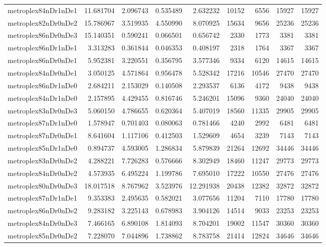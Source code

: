 \begin{longtable}{|l|r|r|r|r|r|r|r|r|}
metroplex84nDr1nDe1 & 11.681704 & 2.096743 & 0.535489 & 2.632232 & 10152 & 6556 & 15927 & 15927 \\
metroplex82nDr0nDe2 & 15.786967 & 3.519935 & 4.550990 & 8.070925 & 15634 & 9656 & 25236 & 25236 \\
metroplex86nDr0nDe3 & 15.140351 & 0.590241 & 0.066501 & 0.656742 & 2330 & 1773 & 3381 & 3381 \\
metroplex86nDr1nDe1 & 3.313283 & 0.361844 & 0.046353 & 0.408197 & 2318 & 1764 & 3367 & 3367 \\
metroplex86nDr0nDe1 & 5.952381 & 3.220551 & 0.356795 & 3.577346 & 9334 & 6120 & 14615 & 14615 \\
metroplex84nDr0nDe1 & 3.050125 & 4.571864 & 0.956478 & 5.528342 & 17216 & 10546 & 27470 & 27470 \\
metroplex86nDr1nDe0 & 2.684211 & 2.153029 & 0.140508 & 2.293537 & 6136 & 4172 & 9438 & 9438 \\
metroplex84nDr1nDe0 & 2.157895 & 4.429455 & 0.816746 & 5.246201 & 15096 & 9360 & 24040 & 24040 \\
metroplex83nDr0nDe3 & 5.060150 & 4.786655 & 0.620364 & 5.407019 & 18560 & 11335 & 29905 & 29905 \\
metroplex87nDr1nDe0 & 1.578947 & 0.701403 & 0.080063 & 0.781466 & 4240 & 2992 & 6481 & 6481 \\
metroplex87nDr0nDe1 & 8.641604 & 1.117106 & 0.412503 & 1.529609 & 4654 & 3239 & 7143 & 7143 \\
metroplex85nDr1nDe0 & 0.894737 & 4.593005 & 1.286834 & 5.879839 & 21264 & 12692 & 34446 & 34446 \\
metroplex83nDr0nDe2 & 4.288221 & 7.726283 & 0.576666 & 8.302949 & 18460 & 11247 & 29773 & 29773 \\
metroplex84nDr0nDe2 & 4.573935 & 6.495224 & 1.199786 & 7.695010 & 17222 & 10550 & 27476 & 27476 \\
metroplex80nDr0nDe3 & 18.017518 & 8.767962 & 3.523976 & 12.291938 & 20438 & 12382 & 32872 & 32872 \\
metroplex87nDr1nDe1 & 9.353383 & 2.495635 & 0.582021 & 3.077656 & 11204 & 7110 & 17780 & 17780 \\
metroplex86nDr0nDe2 & 9.283182 & 3.225143 & 0.678983 & 3.904126 & 14514 & 9033 & 23253 & 23253 \\
metroplex84nDr0nDe3 & 7.466165 & 6.890108 & 1.814093 & 8.704201 & 19002 & 11547 & 30360 & 30360 \\
metroplex85nDr0nDe2 & 7.228070 & 7.044896 & 1.738862 & 8.783758 & 21414 & 12824 & 34646 & 34646 \\

\end{longtable}
